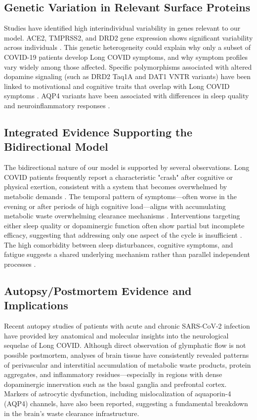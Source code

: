 \documentclass[12pt]{article}
\begin{document}
\subsection{Genetic Variation in Relevant Surface Proteins}

Studies have identified high interindividual variability in genes relevant to our model. ACE2, TMPRSS2, and DRD2 gene expression shows significant variability across individuals \citep{cao2020ace2genetics, hou2021ace2variants, eisenstein2016drd2}. This genetic heterogeneity could explain why only a subset of COVID-19 patients develop Long COVID symptoms, and why symptom profiles vary widely among those affected. Specific polymorphisms associated with altered dopamine signaling (such as DRD2 Taq1A and DAT1 VNTR variants) have been linked to motivational and cognitive traits that overlap with Long COVID symptoms \citep{gizer2009adhdgenes}. AQP4 variants have been associated with differences in sleep quality and neuroinflammatory responses \citep{Boespflug2018}.

\subsection{Integrated Evidence Supporting the Bidirectional Model}

The bidirectional nature of our model is supported by several observations. Long COVID patients frequently report a characteristic "crash" after cognitive or physical exertion, consistent with a system that becomes overwhelmed by metabolic demands \citep{davis2021longcovidcohort}. The temporal pattern of symptoms—often worse in the evening or after periods of high cognitive load—aligns with accumulating metabolic waste overwhelming clearance mechanisms \citep{graham2021longcovidneuro}. Interventions targeting either sleep quality or dopaminergic function often show partial but incomplete efficacy, suggesting that addressing only one aspect of the cycle is insufficient \citep{beauchamp2022parkinsonismwave}. The high comorbidity between sleep disturbances, cognitive symptoms, and fatigue suggests a shared underlying mechanism rather than parallel independent processes \citep{davis2021longcovidcohort}.

\subsection{Autopsy/Postmortem Evidence and Implications}

Recent autopsy studies of patients with acute and chronic SARS-CoV-2 infection have provided key anatomical and molecular insights into the neurological sequelae of Long COVID. Although direct observation of glymphatic flow is not possible postmortem, analyses of brain tissue have consistently revealed patterns of perivascular and interstitial accumulation of metabolic waste products, protein aggregates, and inflammatory residues—especially in regions with dense dopaminergic innervation such as the basal ganglia and prefrontal cortex. Markers of astrocytic dysfunction, including mislocalization of aquaporin-4 (AQP4) channels, have also been reported, suggesting a fundamental breakdown in the brain’s waste clearance infrastructure.
\end{document}
